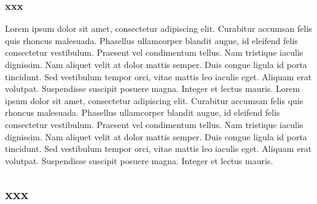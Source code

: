 \documentclass[12pt, a4paper]{book}
\newcommand\apparat[2]{\edtext{#1}{\Afootnote{#2}}}
\newcommand\apparatB[2]{\edtext{#1}{\Bfootnote{#2}}}
\begin{document}
\begin{pages}
\begin{Rightside}
\subsubsection{xxx}
\pend
\pstart
\begin{ledgroup}
\skipnumbering
Lorem ipsum dolor sit amet, consectetur adipiscing elit. Curabitur accumsan felis quis rhoncus malesuada. Phasellus ullamcorper blandit augue, id eleifend felis consectetur vestibulum. Praesent vel condimentum tellus. Nam tristique iaculis dignissim. Nam aliquet velit at dolor mattis semper. Duis congue ligula id porta tincidunt. Sed vestibulum tempor orci, vitae mattis leo iaculis eget. Aliquam erat volutpat. Suspendisse suscipit posuere magna. Integer et lectus mauris. \apparat{aaa}{eeee}
Lorem ipsum dolor sit amet, consectetur adipiscing elit. Curabitur accumsan felis quis rhoncus malesuada. Phasellus ullamcorper blandit augue, id eleifend felis consectetur vestibulum. Praesent vel condimentum tellus. Nam tristique iaculis dignissim. Nam aliquet velit at dolor mattis semper. Duis congue ligula id porta tincidunt. Sed vestibulum tempor orci, vitae mattis leo iaculis eget. Aliquam erat volutpat. Suspendisse suscipit posuere magna. Integer et lectus mauris. \apparatB{aaa}{eeee}
\end{ledgroup}
\pend
\pstart
\subsection{xxx}\skipnumbering

\end{Rightside}
\end{pages}
\end{document}
